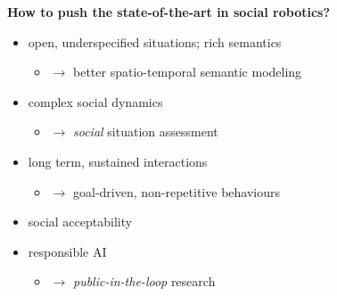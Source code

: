 \documentclass[xcolor=table]{beamer}
\begin{document}
\begin{frame}{}

    \begin{center}

    \Large
    \bf How to push the state-of-the-art in social robotics?

    \end{center}

    \begin{itemize}
        \item open, underspecified situations; rich semantics
            \begin{itemize}
                \item<2-> $\rightarrow$ better spatio-temporal semantic modeling
            \end{itemize}
        \item complex social dynamics
            \begin{itemize}
                \item<3-> $\rightarrow$ \emph{social} situation assessment 
            \end{itemize}
        \item long term, sustained interactions
            \begin{itemize}
                \item<4-> $\rightarrow$ goal-driven, non-repetitive behaviours
            \end{itemize}
    \end{itemize}


    \begin{itemize}
        \item<5-> social acceptability
        \item<5-> responsible AI
            \begin{itemize}
                \item<6-> $\rightarrow$ \emph{public-in-the-loop} research
                    
            \end{itemize}
    \end{itemize}



\end{frame}

\end{document}

